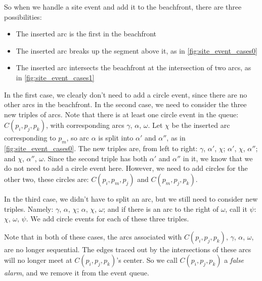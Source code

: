 \documentclass[12pt,twoside]{reedthesis}
\begin{document}
      So when we handle a site event and add it to the beachfront, there are three possibilities:
      \begin{itemize}
      \setlength\itemsep{.5em}
      \item The inserted arc is the first in the beachfront
      \item The inserted arc breaks up the segment above it, as in \cref{fig:site_event_cases0}
      \item The inserted arc intersects the beachfront at the intersection of two arcs, as in \cref{fig:site_event_cases1}
      \end{itemize}
      In the first case, we clearly don't need to add a circle event, since there are no other arcs in the beachfront. In the second case, we need to consider the three new triples of arcs. Note that there is at least one circle event in the queue: $C(p_{i}, p_{j}, p_{k})$, with corresponding arcs $\gamma$, $\alpha$, $\omega$. Let $\chi$ be the inserted arc corresponding to $p_{m}$, so arc $\alpha$ is split into $\alpha'$ and $\alpha''$, as in \cref{fig:site_event_cases0}. The new triples are, from left to right: $\gamma$, $\alpha'$, $\chi$; $\alpha'$, $\chi$, $\alpha''$; and $\chi$, $\alpha''$, $\omega$. Since the second triple has both $\alpha'$ and $\alpha''$ in it, we know that we do not need to add a circle event here. However, we need to add circles for the other two, these circles are: $C(p_{i}, p_{m}, p_{j})$ and $C(p_{m}, p_{j}, p_{k})$. \par

      In the third case, we didn't have to split an arc, but we still need to consider new triples. Namely: $\gamma$, $\alpha$, $\chi$; $\alpha$, $\chi$, $\omega$; and if there is an arc to the right of $\omega$, call it $\psi$:  $\chi$, $\omega$, $\psi$. We add circle events for each of these three triples.\par

      Note that in both of these cases, the arcs associated with $C(p_{i}, p_{j}, p_{k})$, $\gamma$, $\alpha$, $\omega$, are no longer sequential. The edges traced out by the intersections of these arcs will no longer meet at $C(p_{i}, p_{j}, p_{k})$'s center. So we call $C(p_{i}, p_{j}, p_{k})$ a \emph{false alarm}, and we remove it from the event queue.
\end{document}
